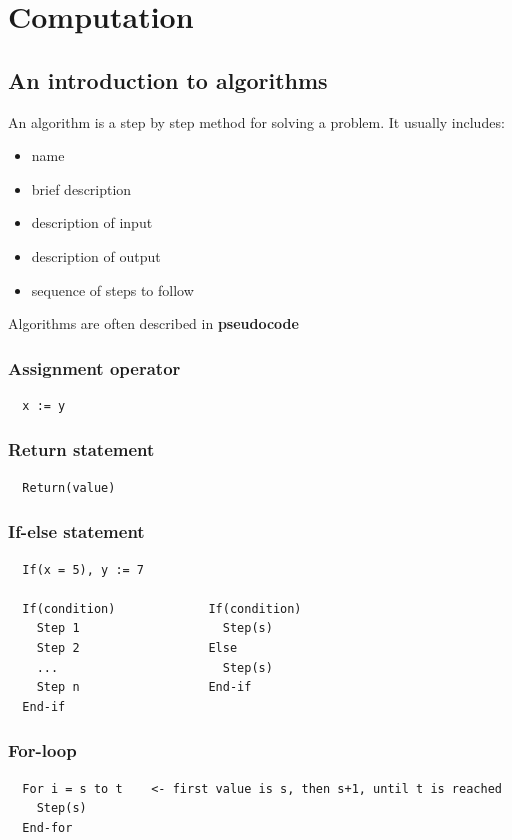 \section{Computation}
\subsection{An introduction to algorithms}
An algorithm is a step by step method for solving a problem. It usually includes:
\begin{itemize}
  \item name
  \item brief description
  \item description of input
  \item description of output
  \item sequence of steps to follow
\end{itemize}
Algorithms are often described in \textbf{pseudocode}

\subsubsection*{Assignment operator}
\begin{lstlisting}
  x := y
\end{lstlisting}

\subsubsection*{Return statement}
\begin{lstlisting}
  Return(value)
\end{lstlisting}

\subsubsection*{If-else statement}
\begin{lstlisting}
  If(x = 5), y := 7

  If(condition)             If(condition)
    Step 1                    Step(s)
    Step 2                  Else
    ...                       Step(s)    
    Step n                  End-if
  End-if
\end{lstlisting}

\subsubsection*{For-loop}
\begin{lstlisting}
  For i = s to t    <- first value is s, then s+1, until t is reached
    Step(s)
  End-for
\end{lstlisting}


